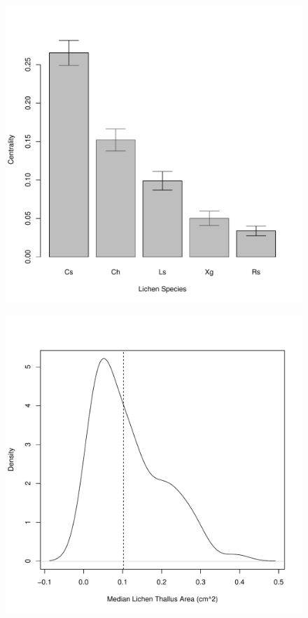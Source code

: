 \documentclass[11pt,twocolumn,twoside,lineno]{pnas-new}
\begin{document}
\begin{figure}[ht]
\centering
\includegraphics[width=\linewidth]{spp_cen.pdf}
\caption{}
\label{fig:}
\end{figure}

\begin{figure}[ht]
\centering
\includegraphics[width=\linewidth]{xg_size.pdf}
\caption{}
\label{fig:}
\end{figure}
\end{document}
